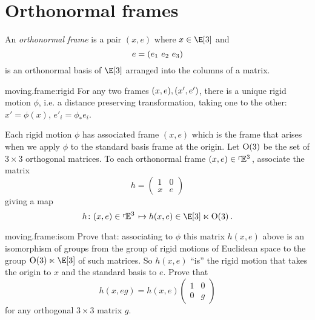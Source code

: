 \section{Orthonormal frames}
An \emph{orthonormal frame} is a pair \((x,e)\) where \(x \in \E[3]\) and 
\[
 e=\left(e_1 \ e_2 \ e_3\right)
\]
is an orthonormal basis of \(\E[3]\) arranged into the columns of a matrix.
\begin{center}
\end{center}
\begin{problem}{moving.frame:rigid}
For any two frames \((x,e), \left(x',e'\right)\), there is a unique rigid motion \(\phi\), i.e. a distance preserving transformation, taking one to the other: \(x'=\phi(x)\), \(e'_i=\phi_* e_i\).
\end{problem}
Each rigid motion \(\phi\) has associated frame \((x,e)\) which is the frame that arises when we apply \(\phi\) to the standard basis frame at the origin.
Let \(\textrm{O}\!\left(3\right)\) be the set of \(3 \times 3\) orthogonal matrices.
To each orthonormal frame \((x,e)\in\left\ulcorner\!\mathbb{E}^{3}\right.\), associate the matrix
\[
h=
\begin{pmatrix}
1 & 0 \\
x & e
\end{pmatrix}
\]
giving a map
\[
h \colon (x,e) \in \frameBundleE{3}\mapsto h(x,e) \in \E[3] \ltimes \Orth{3}.
\]
\begin{problem}{moving.frame:isom}
Prove that: associating to \(\phi\) this matrix \(h(x,e)\) above is an isomorphism of groups from the group of rigid motions of Euclidean space to the group \(\Orth{3} \ltimes \E[3]\) of such matrices.
So \(h(x,e)\) ``is'' the rigid motion that takes the origin to \(x\) and the standard basis to \(e\).
Prove that
\[
h(x,eg)=h(x,e)
\begin{pmatrix}
1 & 0 \\
0 & g
\end{pmatrix}
\]
for any orthogonal \(3 \times 3\) matrix \(g\).
\end{problem}

